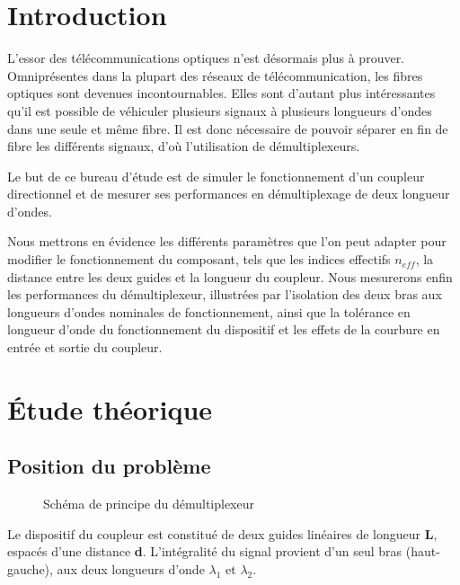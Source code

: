 \documentclass[a4paper,11pt]{report}
\begin{document}


\chapter*{Introduction}

L'essor des télécommunications optiques n'est désormais plus à prouver. Omniprésentes dans la plupart des réseaux de télécommunication, les fibres optiques sont devenues incontournables. Elles sont d'autant plus intéressantes qu'il est possible de véhiculer plusieurs signaux à plusieurs longueurs d'ondes dans une seule et même fibre. \newline
Il est donc nécessaire de pouvoir séparer en fin de fibre les différents signaux, d'où l'utilisation de démultiplexeurs.

Le but de ce bureau d'étude est de simuler le fonctionnement d'un coupleur directionnel et de mesurer ses performances en démultiplexage de deux longueur d'ondes.

Nous mettrons en évidence les différents paramètres que l'on peut adapter pour modifier le fonctionnement du composant, tels que les indices effectifs $n_{eff}$, la distance entre les deux guides et la longueur du coupleur.
\newline
\indent Nous mesurerons enfin les performances du démultiplexeur, illustrées par l'isolation des deux bras aux longueurs d'ondes nominales de fonctionnement, ainsi que la tolérance en longueur d'onde du fonctionnement du dispositif et les effets de la courbure en entrée et sortie du coupleur.


\chapter{Étude théorique}

\section{Position du problème}
\begin{figure}[h]
    \begin{center}
        
        \caption{Schéma de principe du démultiplexeur}
        \label{fig:}
    \end{center}
\end{figure}

Le dispositif du coupleur est constitué de deux guides linéaires de longueur \textbf{L}, espacés d'une distance \textbf{d}.
L'intégralité du signal provient d'un seul bras (haut-gauche), aux deux longueurs d'onde $\lambda_1$ et $\lambda_2$.
\end{document}
